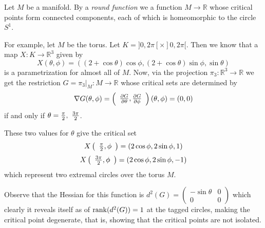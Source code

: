 \documentclass[12pt]{article}
\newcommand{\paren}[1]{\left(\begin{array}{c} #1 \end{array}\right) }
\begin{document}
Let $M$ be a manifold. By a \emph{round function} we  a function $M\to{\mathbb{R}}$ whose critical points form connected components, each of which is homeomorphic to the circle $S^1$.

For example, let $M$ be the torus. Let $K=]0,2\pi[\times]0,2\pi[$.  Then we know that a map 
$X\colon K\to{\mathbb{R}}^3$ given by 
$$X(\theta,\phi)=((2+\cos\theta)\cos\phi,(2+\cos\theta)\sin\phi,\sin\theta)$$
is a parametrization for almost all of $M$. Now, via the projection $\pi_3\colon{\mathbb{R}}^3\to{\mathbb{R}}$
we get the restriction $G=\pi_3|_M\colon M\to{\mathbb{R}}$ whose critical sets are determined by 
$$\nabla G(\theta,\phi)=\paren{{\partial G\over \partial\theta},{\partial G\over \partial\phi}}(\theta,\phi)=(0,0)$$ 
if and only if $\theta={\pi\over 2},\ {3\pi\over 2}$.

These two values for $\theta$ give the critical set
$$X\paren{{\pi\over 2},\phi}=(2\cos\phi,2\sin\phi,1)$$
$$X\paren{{3\pi\over 2},\phi}=(2\cos\phi,2\sin\phi,-1)$$
which represent two extremal circles over the torus $M$.

Observe that the Hessian for this function  is
$d^2(G)=
\left(\begin{array}{cc}
-\sin\theta & 0 \\
0          & 0 
\end{array}\right)
$
which clearly it reveals itself as of ${\rm rank}(d^2(G))=1$ at the tagged circles, 
making the critical point degenerate, that is, showing that the critical points are not isolated.
\end{document}
